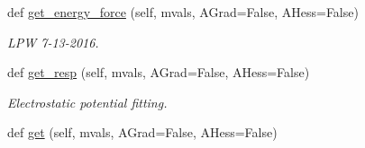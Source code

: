 \begin{DoxyCompactItemize}
\item 
def \hyperlink{classsrc_1_1abinitio_1_1AbInitio_a3b2d4c6ce46dd5e393e2bd6d99f64a48}{get\+\_\+energy\+\_\+force} (self, mvals, A\+Grad=False, A\+Hess=False)
\begin{DoxyCompactList}\small\item\em L\+PW 7-\/13-\/2016. \end{DoxyCompactList}\item 
def \hyperlink{classsrc_1_1abinitio_1_1AbInitio_ab5da2921f88ff384fb87f143d5f8f1c5}{get\+\_\+resp} (self, mvals, A\+Grad=False, A\+Hess=False)
\begin{DoxyCompactList}\small\item\em Electrostatic potential fitting. \end{DoxyCompactList}\item 
def \hyperlink{classsrc_1_1abinitio_1_1AbInitio_a6a5f66c36e73c1ae24f60c042583c71f}{get} (self, mvals, A\+Grad=False, A\+Hess=False)
\end{DoxyCompactItemize}
